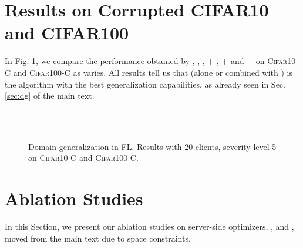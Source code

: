 \section{Results on Corrupted CIFAR10 and CIFAR100}
\label{app:corr}
In Fig. \ref{fig:cifar-c-supp}, we compare the performance obtained by \fedavg, \fedsam, \fedasam, \fedavg+ \swa, \fedsam+ \swa and \fedasam+ \swa on \textsc{Cifar10-C} and \textsc{Cifar100-C} as  varies. All results tell us that \asam (alone or combined with \swa) is the algorithm with the best generalization capabilities, as already seen in Sec. \ref{sec:dg} of the main text. 
\captionsetup[subfloat]{font=scriptsize,labelformat=empty}
\begin{figure}[!t]
    \centering
    \\
    \\
    \caption{\footnotesize{Domain generalization in FL. Results with 20 clients, severity level 5 on \textsc{Cifar10-C} and \textsc{Cifar100-C}.}}
    \label{fig:cifar-c-supp}
    \vspace{-0.5cm}
\end{figure}

\section{Ablation Studies}
\label{app:abl}
In this Section, we present our ablation studies on server-side optimizers, \sam, \asam and \swa, moved from the main text due to space constraints.

